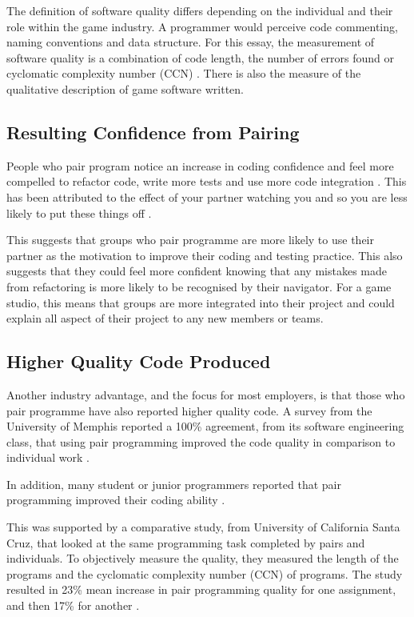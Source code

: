 \documentclass{scrartcl}
\begin{document}
The definition of software quality differs depending on the individual and their role within the game industry. A programmer would perceive code commenting, naming conventions and data structure. For this essay, the measurement of software quality is a combination of code length, the number of errors found or cyclomatic complexity number (CCN) \cite{Xenos:2000}. There is also the measure of the qualitative description of game software written.

\subsection{Resulting Confidence from Pairing}
People who pair program notice an increase in coding confidence and feel more compelled to refactor code, write more tests and use more code integration \cite{Sherrell:2006}. This has been attributed to the effect of your partner watching you and so you are less likely to put these things off \cite{Beck:2000}. 

This suggests that groups who pair programme are more likely to use their partner as the motivation to improve their coding and testing practice. This also suggests that they could feel more confident knowing that any mistakes made from refactoring is more likely to be recognised by their navigator. For a game studio, this means that groups are more integrated into their project and could explain all aspect of their project to any new members or teams.

\subsection{Higher Quality Code Produced}
Another industry advantage, and the focus for most employers, is that those who pair programme have also reported higher quality code. A survey from the University of Memphis reported a 100\% agreement, from its software engineering class, that using pair programming improved the code quality in comparison to individual work \cite{Sherrell:2006}.

 In addition, many student or junior programmers reported that pair programming improved their coding ability \cite{Radermacher:2011}.

This was supported by a comparative study, from University of California Santa Cruz, that looked at the same programming task completed by pairs and individuals. To objectively measure the quality, they measured the length of the programs and the cyclomatic complexity number (CCN)\cite{Xenos:2000} of programs. The study resulted in 23\% mean increase in pair programming quality for one assignment, and then 17\% for another \cite{Hanks:2004}.
\end{document}
